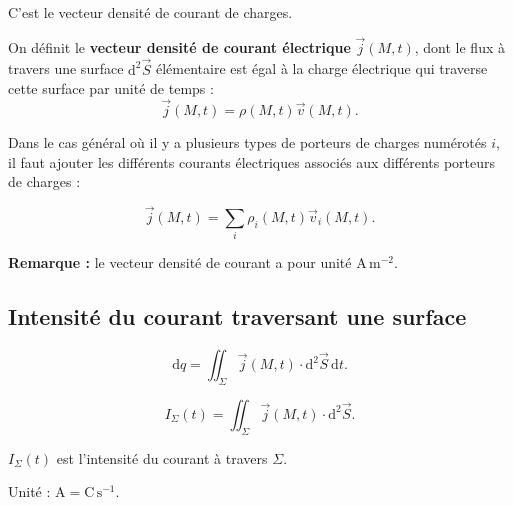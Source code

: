\documentclass[11pt,a4paper]{article}
\newcommand{\dd}{\mathrm d}
\newcommand{\vj}{\vec j}
\begin{document}
C'est le vecteur densité de courant de charges.
\begin{cadre}On définit le \textbf{vecteur densité de courant électrique} $\vj(M,t)$, dont le flux à travers une surface $\dd^2\vec S$ élémentaire est égal à la charge électrique qui traverse cette surface par unité de temps :
\[\vj(M,t)=\rho(M,t)\vec v(M,t).\]\end{cadre}
Dans le cas général où il y a plusieurs types de porteurs de charges numérotés $i$, il faut ajouter les différents courants électriques associés aux différents porteurs de charges :
\begin{cadre}\[\vj(M,t)=\sum_i\rho_i(M,t)\vec v_i(M,t).\]\end{cadre}
\textbf{Remarque :} le vecteur densité de courant a pour unité $\mathrm{A\,m^{-2}}$.
\subsection{Intensité du courant traversant une surface}

\[\dd q=\iint_\Sigma\vj(M,t)\cdot\dd^2\vec S\,\dd t.\]
\begin{cadre}\[I_\Sigma(t)=\iint_\Sigma\vj(M,t)\cdot\dd^2\vec S.\]\end{cadre}
$I_\Sigma(t)$ est l'intensité du courant à travers $\Sigma$.

Unité : $\mathrm A=\mathrm{C\,s^{-1}}$.
\end{document}

